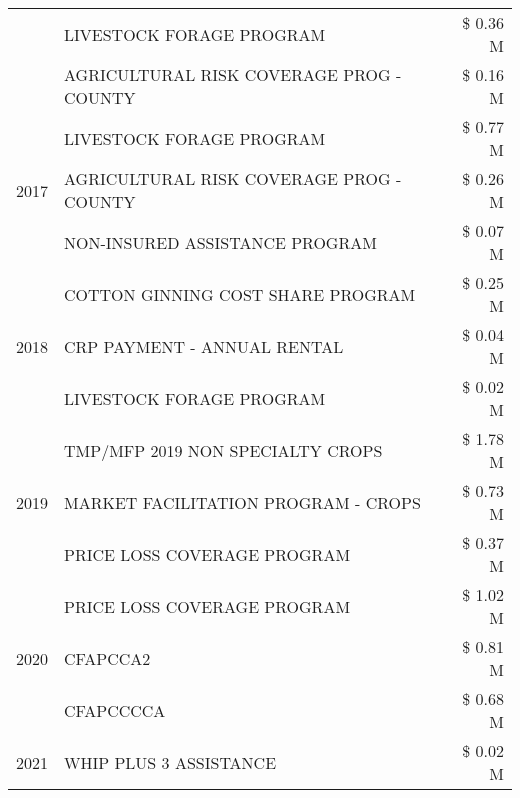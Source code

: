 \begin{tabular}{llr}
 & LIVESTOCK FORAGE PROGRAM                      & \$ 0.36 M \\
 & AGRICULTURAL RISK COVERAGE PROG - COUNTY      & \$ 0.16 M \\
\cline{1-3}
\multirow[t]{3}{*}{2017} & LIVESTOCK FORAGE PROGRAM & \$ 0.77 M \\
 & AGRICULTURAL RISK COVERAGE PROG - COUNTY & \$ 0.26 M \\
 & NON-INSURED ASSISTANCE PROGRAM & \$ 0.07 M \\
\cline{1-3}
\multirow[t]{3}{*}{2018} & COTTON GINNING COST SHARE PROGRAM & \$ 0.25 M \\
 & CRP PAYMENT - ANNUAL RENTAL & \$ 0.04 M \\
 & LIVESTOCK FORAGE PROGRAM & \$ 0.02 M \\
\cline{1-3}
\multirow[t]{3}{*}{2019} & TMP/MFP 2019 NON SPECIALTY CROPS & \$ 1.78 M \\
 & MARKET FACILITATION PROGRAM - CROPS & \$ 0.73 M \\
 & PRICE LOSS COVERAGE PROGRAM & \$ 0.37 M \\
\cline{1-3}
\multirow[t]{3}{*}{2020} & PRICE LOSS COVERAGE PROGRAM & \$ 1.02 M \\
 & CFAPCCA2 & \$ 0.81 M \\
 & CFAPCCCCA & \$ 0.68 M \\
\cline{1-3}
2021 & WHIP PLUS 3 ASSISTANCE & \$ 0.02 M \\
\cline{1-3}
\bottomrule
\end{tabular}
